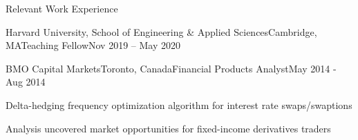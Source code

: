 \documentclass{resume} %
\begin{document}
\begin{rSection}{Relevant Work Experience}
\begin{rSubsection}{Harvard University, School of Engineering \& Applied Sciences}{Cambridge, MA}{Teaching Fellow}{Nov 2019 -- May 2020}
\end{rSubsection}


\begin{rSubsection}{BMO Capital Markets}{Toronto, Canada}{Financial Products Analyst}{May 2014 - Aug 2014}

\item Delta-hedging frequency optimization algorithm for interest rate swaps/swaptions
\item Analysis uncovered market opportunities for fixed-income derivatives traders
    
\end{rSubsection}


\end{rSection}


\newpage
\end{document}
